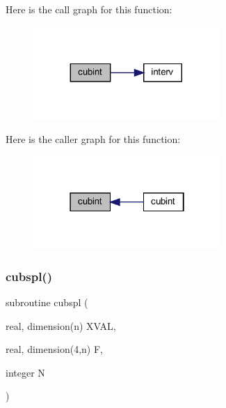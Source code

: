 Here is the call graph for this function\+:\nopagebreak
\begin{figure}[H]
\begin{center}
\leavevmode
\includegraphics[width=200pt]{Leroi_8f90_aee021b0986763ff84e2a9373cd2c5b9f_cgraph}
\end{center}
\end{figure}
Here is the caller graph for this function\+:\nopagebreak
\begin{figure}[H]
\begin{center}
\leavevmode
\includegraphics[width=202pt]{Leroi_8f90_aee021b0986763ff84e2a9373cd2c5b9f_icgraph}
\end{center}
\end{figure}
\mbox{\label{Leroi_8f90_a836d1cb8acb3544a3a9fa63433efc1b6}} 
\subsubsection{\texorpdfstring{cubspl()}{cubspl()}}
{\footnotesize\ttfamily subroutine cubspl (\begin{DoxyParamCaption}\item[{real, dimension(n)}]{X\+V\+AL,  }\item[{real, dimension(4,n)}]{F,  }\item[{integer}]{N }\end{DoxyParamCaption})}

